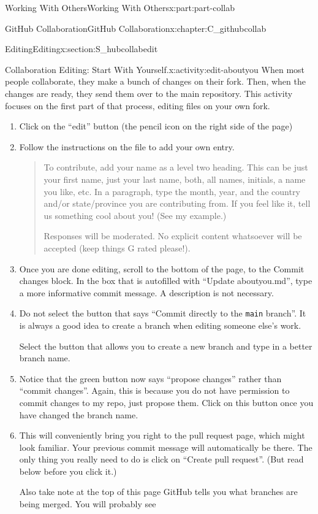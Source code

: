 \documentclass[oneside,10pt,]{book}
\newcommand{\mono}[1]{\texttt{#1}}
\begin{document}
\begin{partptx}{Working With Others}{}{Working With Others}{}{}{x:part:part-collab}
\begin{chapterptx}{GitHub Collaboration}{}{GitHub Collaboration}{}{}{x:chapter:C_githubcollab}
\begin{sectionptx}{Editing}{}{Editing}{}{}{x:section:S_hubcollabedit}
\begin{activity}{Collaboration Editing: Start With Yourself.}{x:activity:edit-aboutyou}
When most people collaborate, they make a bunch of changes on their fork. Then, when the changes are ready, they send them over to the main repository. This activity focuses on the first part of that process, editing files on your own fork.%
\begin{enumerate}[font=\bfseries,label=(\alph*),ref=\alph*]
\item{}Click on the ``edit'' button (the pencil icon on the right side of the page)%
\item{}Follow the instructions on the file to add your own entry. \begin{quote}%
To contribute, add your name as a level two heading. This can be just your first name, just your last name, both, all names, initials, a name you like, etc. In a paragraph, type the month, year, and the country and\slash{}or state\slash{}province you are contributing from. If you feel like it, tell us something cool about you! (See my example.)%
\par
Responses will be moderated. No explicit content whatsoever will be accepted (keep things G rated please!).%
\end{quote}
%
\item{}Once you are done editing, scroll to the bottom of the page, to the Commit changes block. In the box that is autofilled with ``Update aboutyou.md'', type a more informative commit message. A description is not necessary.%
\item{}Do not select the button that says ``Commit directly to the \mono{main} branch''. It is always a good idea to create a branch when editing someone else's work.%
\par
Select the button that allows you to create a new branch and type in a better branch name.%
\item{}Notice that the green button now says ``propose changes'' rather than ``commit changes''. Again, this is because you do not have permission to commit changes to my repo, just propose them. Click on this button once you have changed the branch name.%
\item{}This will conveniently bring you right to the pull request page, which might look familiar. Your previous commit message will automatically be there. The only thing you really need to do is click on ``Create pull request''. (But read below before you click it.)%
\par
Also take note at the top of this page GitHub tells you what branches are being merged. You will probably see \begin{quote}%

\end{quote}
\end{enumerate}
\end{activity}
\end{sectionptx}
\end{chapterptx}
\end{partptx}
\end{document}
